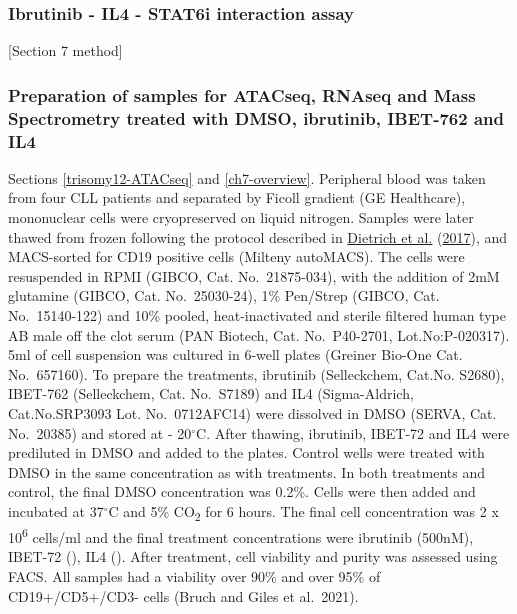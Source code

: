 \documentclass[11pt, a4paper, twosided]{book}
\begin{document}
\hypertarget{ibrutinib---il4---stat6i-interaction-assay}{%
\subsubsection{Ibrutinib - IL4 - STAT6i interaction assay}\label{ibrutinib---il4---stat6i-interaction-assay}}

{[}Section 7 method{]}

\hypertarget{preparation-of-samples-for-atacseq-rnaseq-and-mass-spectrometry-treated-with-dmso-ibrutinib-ibet-762-and-il4}{%
\subsubsection{Preparation of samples for ATACseq, RNAseq and Mass Spectrometry treated with DMSO, ibrutinib, IBET-762 and IL4}\label{preparation-of-samples-for-atacseq-rnaseq-and-mass-spectrometry-treated-with-dmso-ibrutinib-ibet-762-and-il4}}

Sections \ref{trisomy12-ATACseq} and \ref{ch7-overview}. Peripheral blood was taken from four CLL patients and separated by Ficoll gradient (GE Healthcare), mononuclear cells were cryopreserved on liquid nitrogen. Samples were later thawed from frozen following the protocol described in \protect\hyperlink{ref-JCIpaper}{Dietrich et al.} (\protect\hyperlink{ref-JCIpaper}{2017}), and MACS-sorted for CD19 positive cells (Milteny autoMACS). The cells were resuspended in RPMI (GIBCO, Cat. No.~21875-034), with the addition of 2mM glutamine (GIBCO, Cat. No.~25030-24), 1\% Pen/Strep (GIBCO, Cat. No.~15140-122) and 10\% pooled, heat-inactivated and sterile filtered human type AB male off the clot serum (PAN Biotech, Cat. No.~P40-2701, Lot.No:P-020317). 5ml of cell suspension was cultured in 6-well plates (Greiner Bio-One Cat. No.~657160). To prepare the treatments, ibrutinib (Selleckchem, Cat.No. S2680), IBET-762 (Selleckchem, Cat. No.~S7189) and IL4 (Sigma-Aldrich, Cat.No.SRP3093 Lot. No.~0712AFC14) were dissolved in DMSO (SERVA, Cat. No.~20385) and stored at - 20\(^\circ\)C. After thawing, ibrutinib, IBET-72 and IL4 were prediluted in DMSO and added to the plates. Control wells were treated with DMSO in the same concentration as with treatments. In both treatments and control, the final DMSO concentration was 0.2\%. Cells were then added and incubated at 37\(^\circ\)C and 5\% CO\textsubscript{2} for 6 hours. The final cell concentration was 2 x 10\textsuperscript{6} cells/ml and the final treatment concentrations were ibrutinib (500nM), IBET-72 (), IL4 (). After treatment, cell viability and purity was assessed using FACS. All samples had a viability over 90\% and over 95\% of CD19+/CD5+/CD3- cells (Bruch and Giles et al.~2021).
\end{document}
